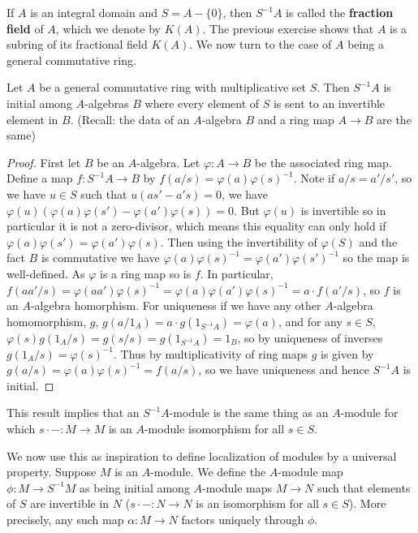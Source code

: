 If $A$ is an integral domain and $S = A-\{0\}$, then $S^{-1}A$ is called the \textbf{fraction field} of $A$, which we denote by $K(A)$. The previous exercise shows that $A$ is a subring of its fractional field $K(A)$. We now turn to the case of $A$ being a general commutative ring.

\begin{theorem}
    Let $A$ be a general commutative ring with multiplicative set $S$. Then $S^{-1}A$ is initial among $A$-algebras $B$ where every element of $S$ is sent to an invertible element in $B$. (Recall: the data of an $A$-algebra $B$ and a ring map $A\rightarrow B$ are the same)
\end{theorem}
\begin{proof}
    First let $B$ be an $A$-algebra. Let $\varphi:A\rightarrow B$ be the associated ring map. Define a map $f:S^{-1}A\rightarrow B$ by $f(a/s) = \varphi(a)\varphi(s)^{-1}$. Note if $a/s = a'/s'$, so we have $u \in S$ such that $u(as'-a's) = 0$, we have $\varphi(u)(\varphi(a)\varphi(s')-\varphi(a')\varphi(s)) = 0$. But $\varphi(u)$ is invertible so in particular it is not a zero-divisor, which means this equality can only hold if $\varphi(a)\varphi(s') = \varphi(a')\varphi(s)$. Then using the invertibility of $\varphi(S)$ and the fact $B$ is commutative we have $\varphi(a)\varphi(s)^{-1} = \varphi(a')\varphi(s')^{-1}$ so the map is well-defined. As $\varphi$ is a ring map so is $f$. In particular, $f(aa'/s) = \varphi(aa')\varphi(s)^{-1} = \varphi(a)\varphi(a')\varphi(s)^{-1}= a\cdot f(a'/s)$, so $f$ is an $A$-algebra homorphism. For uniqueness if we have any other $A$-algebra homomorphism, $g$, $g(a/1_A) = a\cdot g(1_{S^{-1}A}) = \varphi(a)$, and for any $s \in S$, $\varphi(s)g(1_A/s) = g(s/s) = g(1_{S^{-1}A}) = 1_B$, so by uniqueness of inverses $g(1_A/s) = \varphi(s)^{-1}$. Thus by multiplicativity of ring maps $g$ is given by $g(a/s) = \varphi(a)\varphi(s)^{-1} = f(a/s)$, so we have uniqueness and hence $S^{-1}A$ is initial.
\end{proof}
This result implies that an $S^{-1}A$-module is the same thing as an $A$-module for which $s\cdot -:M\rightarrow M$ is an $A$-module isomorphism for all $s \in S$.

We now use this as inspiration to define localization of modules by a universal property. Suppose $M$ is an $A$-module. We define the $A$-module map $\phi:M\rightarrow S^{-1}M$ as being initial among $A$-module maps $M\rightarrow N$ such that elements of $S$ are invertible in $N$ ($s\cdot -:N\rightarrow N$ is an isomorphism for all $s \in S$). More precisely, any such map $\alpha:M\rightarrow N$ factors uniquely through $\phi$.

